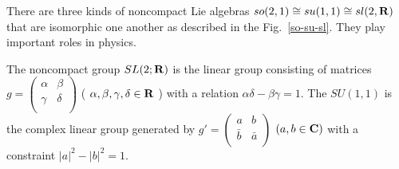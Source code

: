 \documentclass[a4paper,11pt]{article}
\begin{document}
There are three kinds of noncompact Lie algebras 
$so(2,1) \cong su(1,1) \cong sl(2,{\bf R})$ that are isomorphic one another as described in the Fig.~\ref{so-su-sl}. They play important roles in physics. 



The noncompact group $SL(2;{\bf R})$ is the linear group consisting of 
matrices $g=\left(\begin{array}{cc} \alpha & \beta \\ 
\gamma & \delta \\ \end{array}\right)$
( $\alpha ,\beta ,\gamma ,\delta \in{\bf R}$ ) with a relation $\alpha \delta -\beta \gamma =1$. The $SU(1,1)$ is the complex linear group 
generated by $g'=\left(\begin{array}{cc} a & b \\ 
\bar{b} & \bar{a} \\ \end{array}\right)$
$(a,b\in {\bf C})$ with a constraint $|a|^2-|b|^2=1$. 
\end{document}
